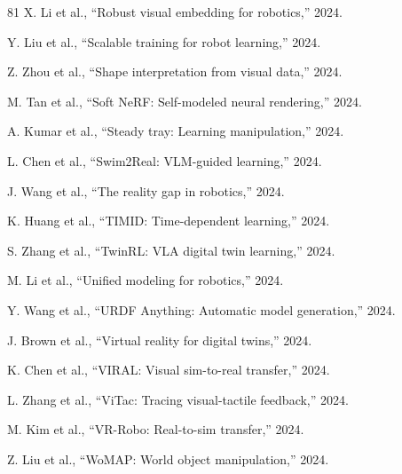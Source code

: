 \documentclass[journal]{IEEEtran}
\begin{document}
\begin{thebibliography}{81}
 X. Li et al., ``Robust visual embedding for robotics,'' 2024.

 Y. Liu et al., ``Scalable training for robot learning,'' 2024.

 Z. Zhou et al., ``Shape interpretation from visual data,'' 2024.

 M. Tan et al., ``Soft NeRF: Self-modeled neural rendering,'' 2024.

 A. Kumar et al., ``Steady tray: Learning manipulation,'' 2024.

 L. Chen et al., ``Swim2Real: VLM-guided learning,'' 2024.

 J. Wang et al., ``The reality gap in robotics,'' 2024.

 K. Huang et al., ``TIMID: Time-dependent learning,'' 2024.

 S. Zhang et al., ``TwinRL: VLA digital twin learning,'' 2024.

 M. Li et al., ``Unified modeling for robotics,'' 2024.

 Y. Wang et al., ``URDF Anything: Automatic model generation,'' 2024.

 J. Brown et al., ``Virtual reality for digital twins,'' 2024.

 K. Chen et al., ``VIRAL: Visual sim-to-real transfer,'' 2024.

 L. Zhang et al., ``ViTac: Tracing visual-tactile feedback,'' 2024.

 M. Kim et al., ``VR-Robo: Real-to-sim transfer,'' 2024.

 Z. Liu et al., ``WoMAP: World object manipulation,'' 2024.

\end{thebibliography}
\end{document}

